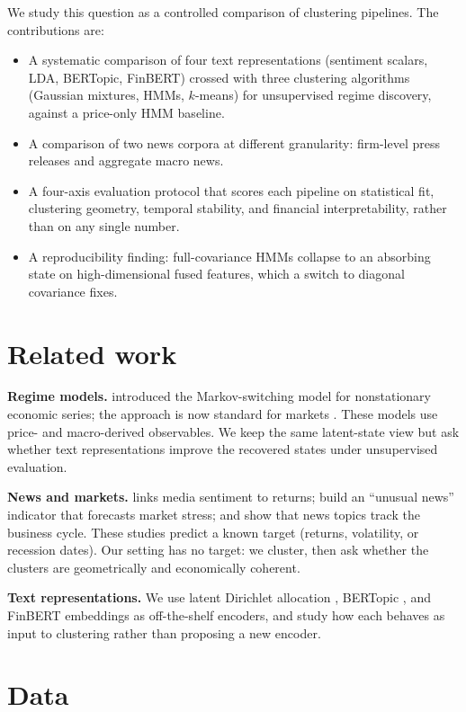 \documentclass{article} %
\begin{document}
We study this question as a controlled comparison of clustering pipelines. The
contributions are:
\begin{itemize}
  \item A systematic comparison of four text representations (sentiment
  scalars, LDA, BERTopic, FinBERT) crossed with three clustering algorithms
  (Gaussian mixtures, HMMs, $k$-means) for unsupervised regime discovery, against a
  price-only HMM baseline.
  \item A comparison of two news corpora at different granularity: firm-level
  press releases and aggregate macro news.
  \item A four-axis evaluation protocol that scores each pipeline on
  statistical fit, clustering geometry, temporal stability, and financial
  interpretability, rather than on any single number.
  \item A reproducibility finding: full-covariance HMMs collapse to an
  absorbing state on high-dimensional fused features, which a switch to
  diagonal covariance fixes.
\end{itemize}

\section{Related work}

\textbf{Regime models.} \citet{hamilton1989} introduced the Markov-switching
model for nonstationary economic series; the approach is now standard for
markets \citep{ang2012}. These models use price- and macro-derived observables.
We keep the same latent-state view but ask whether text representations improve
the recovered states under unsupervised evaluation.

\textbf{News and markets.} \citet{tetlock2007} links media sentiment to
returns; \citet{glasserman2019} build an ``unusual news'' indicator that
forecasts market stress; and \citet{bybee2024} show that news topics track the
business cycle. These studies predict a known target (returns, volatility, or
recession dates). Our setting has no target: we cluster, then ask whether the
clusters are geometrically and economically coherent.

\textbf{Text representations.} We use latent Dirichlet allocation
\citep{blei2003}, BERTopic \citep{grootendorst2022}, and FinBERT
\citep{araci2019} embeddings \citep{reimers2019} as off-the-shelf encoders, and
study how each behaves as input to clustering rather than proposing a new
encoder.

\section{Data}
\label{sec:data}
\end{document}
